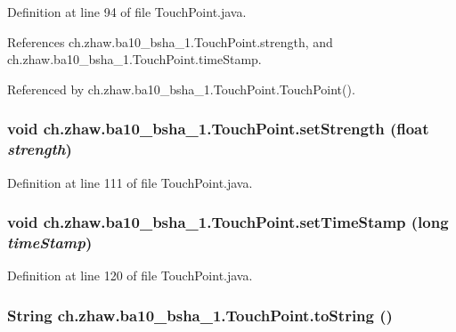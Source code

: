 Definition at line 94 of file TouchPoint.java.

References ch.zhaw.ba10\_\-bsha\_\-1.TouchPoint.strength, and ch.zhaw.ba10\_\-bsha\_\-1.TouchPoint.timeStamp.

Referenced by ch.zhaw.ba10\_\-bsha\_\-1.TouchPoint.TouchPoint().\hypertarget{classch_1_1zhaw_1_1ba10__bsha__1_1_1TouchPoint_acccafc087a2fd76987d8f829390626d7}{
\subsubsection[{setStrength}]{\setlength{\rightskip}{0pt plus 5cm}void ch.zhaw.ba10\_\-bsha\_\-1.TouchPoint.setStrength (float {\em strength})}}
\label{classch_1_1zhaw_1_1ba10__bsha__1_1_1TouchPoint_acccafc087a2fd76987d8f829390626d7}


Definition at line 111 of file TouchPoint.java.\hypertarget{classch_1_1zhaw_1_1ba10__bsha__1_1_1TouchPoint_aae69659dd478457f14287116e34f868e}{
\subsubsection[{setTimeStamp}]{\setlength{\rightskip}{0pt plus 5cm}void ch.zhaw.ba10\_\-bsha\_\-1.TouchPoint.setTimeStamp (long {\em timeStamp})}}
\label{classch_1_1zhaw_1_1ba10__bsha__1_1_1TouchPoint_aae69659dd478457f14287116e34f868e}


Definition at line 120 of file TouchPoint.java.\hypertarget{classch_1_1zhaw_1_1ba10__bsha__1_1_1TouchPoint_a4e930068dfcb62f5ff8a7dd60ae2a04c}{
\subsubsection[{toString}]{\setlength{\rightskip}{0pt plus 5cm}String ch.zhaw.ba10\_\-bsha\_\-1.TouchPoint.toString ()}}
\label{classch_1_1zhaw_1_1ba10__bsha__1_1_1TouchPoint_a4e930068dfcb62f5ff8a7dd60ae2a04c}


